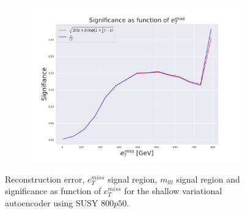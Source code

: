 \begin{figure}[H]
    \hfill  
    \begin{subfigure}{.60\textwidth}
        \includegraphics[width=\textwidth]{Figures/VAE_testing/small/2lep/significance_etmiss_800p0p050_-0.8542149600758421.pdf}
        \caption{}
        \label{ffig:VAE_2lep_small_signi_800}
    \end{subfigure}
    \hfill      
    \caption[2lep shallow network | $800p50$ | VAE]{Reconstruction error, $e_T^{miss}$ signal region, $m_{lll}$ signal region and significance as function of 
    $e_T^{miss}$ for the shallow variational autoencoder using SUSY $800p50$.}
    \label{fig:VAE_2lep_small_rec_sig_signi_800}
\end{figure}



